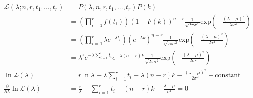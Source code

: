 \begin{Parts}
\begin{solution}
    \begin{align}
        \begin{aligned}
            \mathcal{L}(\lambda; n, r, t_1,...,t_r) &= P(\lambda, n, r, t_1,...,t_r)P(k)\\
            &= (\prod^r_{i=1}f(t_i))(1 - F(k))^{n-r} \frac{1}{\sqrt{2 \pi \sigma^2}}\text{exp}(-\frac{(\lambda - \mu)^2}{2\sigma ^ 2})\\
            &= (\prod^r_{i=1}\lambda e^{-\lambda t_i})(e^{-\lambda k})^{n-r}\frac{1}{\sqrt{2 \pi \sigma^2}}\text{exp}(-\frac{(\lambda - \mu)^2}{2\sigma ^ 2})\\
            &= \lambda^r e^{-\lambda \sum^r_{i=1} t_i} e^{-\lambda(n-r)k} \frac{1}{\sqrt{2 \pi \sigma^2}}\text{exp}(-\frac{(\lambda - \mu)^2}{2\sigma ^ 2})\\
            \ln \mathcal{L(\lambda)} &= r\ln \lambda - \lambda \sum^r_{i=1}t_i - \lambda(n-r)k - \frac{(\lambda - \mu)^2}{2\sigma ^ 2}+ \text{constant}\\
            \frac{\partial}{\partial \lambda} \ln \mathcal{L}(\lambda) &= \frac{r}{\lambda} - \sum^r_{i=1} t_i - (n-r)k - \frac{\lambda + \mu}{\sigma^2}= 0\\
        \end{aligned}
    \end{align}

\end{solution}


\end{Parts}
